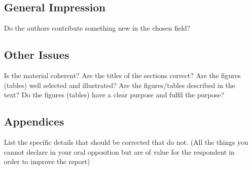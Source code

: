 \documentclass[11pt,a4paper]{article}
\begin{document}
\subsection*{General Impression}
Do the authors contribute something new in the chosen field?

\subsection*{Other Issues}
Is the material coherent? Are the titles of the sections correct? Are the figures (tables) well selected and illustrated? Are the figures/tables described in the text? Do the figures (tables) have a clear purpose and fulfil the purpose?

\subsection*{Appendices}
List the specific details that should be corrected that do not. (All the things you cannot declare in your oral opposition but are of value for the respondent in order to improve the report)
\end{document}
